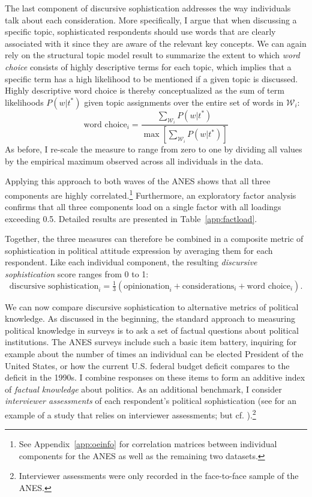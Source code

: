 The last component of discursive sophistication addresses the way individuals talk about each consideration. More specifically, I argue that when discussing a specific topic, sophisticated respondents should use words that are clearly associated with it since they are aware of the relevant key concepts. We can again rely on the structural topic model result to summarize the extent to which \textit{word choice} consists of highly descriptive terms for each topic, which implies that a specific term has a high likelihood to be mentioned if a given topic is discussed. Highly descriptive word choice is thereby conceptualized as the sum of term likelihoods $P(w|t^*)$ given topic assignments over the entire set of words in $\mathcal{W}_i$:
\begin{equation}
\text{word choice}_i = \dfrac{\sum_{\mathcal{W}_i} P(w|t^*)}{\max\left[\sum_{\mathcal{W}_i} P(w|t^*)\right]}
\end{equation}
As before, I re-scale the measure to range from zero to one by dividing all values by the empirical maximum observed across all individuals in the data.

Applying this approach to both waves of the ANES shows that all three components are highly correlated.\footnote{See Appendix~\ref{app:oeinfo} for correlation matrices between individual components for the ANES as well as the remaining two datasets.} Furthermore, an exploratory factor analysis confirms that all three components load on a single factor with all loadings exceeding 0.5. Detailed results are presented in Table~\ref{app:factload}.



Together, the three measures can therefore be combined in a composite metric of sophistication in political attitude expression by averaging them for each respondent. Like each individual component, the resulting \textit{discursive sophistication} score ranges from 0 to 1:
\begin{equation}
\text{discursive sophistication}_i = \tfrac{1}{3}(\text{opinionation}_i + \text{considerations}_i + \text{word choice}_i).
\end{equation}

We can now compare discursive sophistication to alternative metrics of political knowledge. As discussed in the beginning, the standard approach to measuring political knowledge in surveys is to ask a set of factual questions about political institutions. The ANES surveys include such a basic item battery, inquiring for example about the number of times an individual can be elected President of the United States, or how the current U.S. federal budget deficit compares to the deficit in the 1990s. I combine responses on these items to form an additive index of \textit{factual knowledge} about politics. As an additional benchmark, I consider \textit{interviewer assessments} of each respondent's political sophistication (see \citealt{bartels2005homer} for an example of a study that relies on interviewer assessments; but cf. \citealt{ryan2011accuracy}).\footnote{Interviewer assessments were only recorded in the face-to-face sample of the ANES.}

